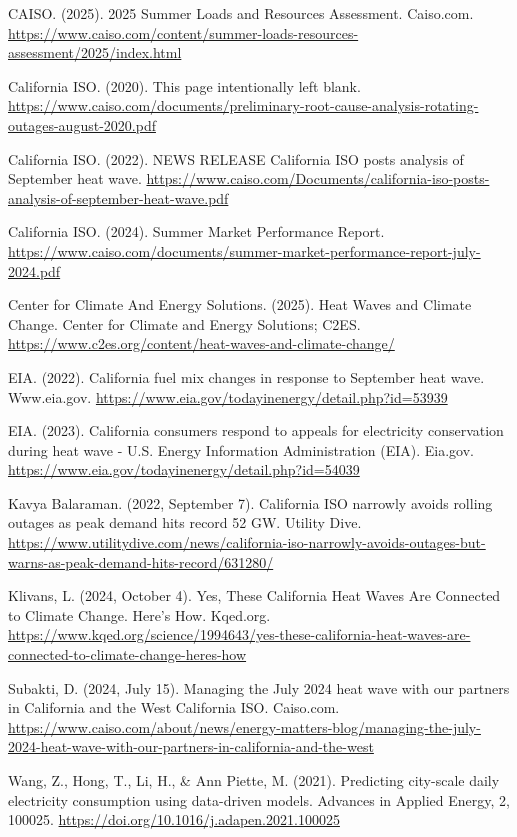 \documentclass[
]{article}
\begin{document}
CAISO. (2025). 2025 Summer Loads and Resources Assessment. Caiso.com.
\url{https://www.caiso.com/content/summer-loads-resources-assessment/2025/index.html}

California ISO. (2020). This page intentionally left blank.
\url{https://www.caiso.com/documents/preliminary-root-cause-analysis-rotating-outages-august-2020.pdf}

California ISO. (2022). NEWS RELEASE California ISO posts analysis of
September heat wave.
\url{https://www.caiso.com/Documents/california-iso-posts-analysis-of-september-heat-wave.pdf}

California ISO. (2024). Summer Market Performance Report.
\url{https://www.caiso.com/documents/summer-market-performance-report-july-2024.pdf}

Center for Climate And Energy Solutions. (2025). Heat Waves and Climate
Change. Center for Climate and Energy Solutions; C2ES.
\url{https://www.c2es.org/content/heat-waves-and-climate-change/}

EIA. (2022). California fuel mix changes in response to September heat
wave. Www.eia.gov.
\url{https://www.eia.gov/todayinenergy/detail.php?id=53939}

EIA. (2023). California consumers respond to appeals for electricity
conservation during heat wave - U.S. Energy Information Administration
(EIA). Eia.gov.
\url{https://www.eia.gov/todayinenergy/detail.php?id=54039}

Kavya Balaraman. (2022, September 7). California ISO narrowly avoids
rolling outages as peak demand hits record 52 GW. Utility Dive.
\url{https://www.utilitydive.com/news/california-iso-narrowly-avoids-outages-but-warns-as-peak-demand-hits-record/631280/}

Klivans, L. (2024, October 4). Yes, These California Heat Waves Are
Connected to Climate Change. Here's How. Kqed.org.
\url{https://www.kqed.org/science/1994643/yes-these-california-heat-waves-are-connected-to-climate-change-heres-how}

Subakti, D. (2024, July 15). Managing the July 2024 heat wave with our
partners in California and the West \textbar{} California ISO.
Caiso.com.
\url{https://www.caiso.com/about/news/energy-matters-blog/managing-the-july-2024-heat-wave-with-our-partners-in-california-and-the-west}

Wang, Z., Hong, T., Li, H., \& Ann Piette, M. (2021). Predicting
city-scale daily electricity consumption using data-driven models.
Advances in Applied Energy, 2, 100025.
\url{https://doi.org/10.1016/j.adapen.2021.100025}
\end{document}
